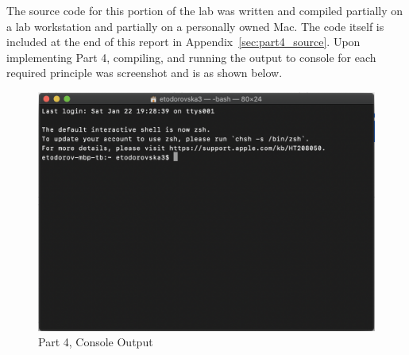         \medskip
        \noindent The source code for this portion of the lab was written and compiled partially on a lab workstation and partially on a personally owned Mac.
        The code itself is included at the end of this report in Appendix~\ref{sec:part4_source}.
        Upon implementing Part 4, compiling, and running the output to console for each required principle was screenshot and is as shown below.

        \begin{figure}[H]
            \centering
            \includegraphics[width=\linewidth]{figures/placeholder.png}
            \caption{Part 4, Console Output}
            \label{fig:part4_output}
        \end{figure}
